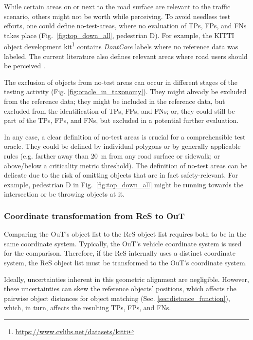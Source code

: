 \documentclass[conference]{IEEEtran}
\begin{document}
While certain areas on or next to the road surface are relevant to the traffic scenario, others might not be worth while perceiving. 
To avoid needless test efforts, one could define no-test-areas, where no evaluation of TPs, FPs, and FNs takes place (Fig.~\ref{fig:top_down_all}, pedestrian D). 
For example, the KITTI object development kit\footnote{\url{https://www.cvlibs.net/datasets/kitti}} contains \textit{DontCare} labels where no reference data was labeled. 
The current literature also defines relevant areas where road users should be perceived \cite{Philipp2022systematization, Topan2022zones, Butz2020soca, Wolf2021people, Chu2023sotif}.

The exclusion of objects from no-test areas can occur in different stages of the testing activity (Fig. \ref{fig:oracle_in_taxonomy}). 
They might already be excluded from the reference data; they might be included in the reference data, but excluded from the identification of TPs, FPs, and FNs; or, they could still be part of the TPs, FPs, and FNs, but excluded in a potential further evaluation.

In any case, a clear definition of no-test areas is crucial for a comprehensible test oracle. 
They could be defined by individual polygons or by generally applicable rules (e.g. farther away than \SI{20}{\meter} from any road surface or sidewalk; or above/below a criticality metric threshold).
The definition of no-test areas can be delicate due to the risk of omitting objects that are in fact safety-relevant. 
For example, pedestrian D in Fig.~\ref{fig:top_down_all} might be running towards the intersection or be throwing objects at it.

\subsubsection{Coordinate transformation from ReS to OuT}
\label{sec:geometrical_alignment}

Comparing the OuT's object list to the ReS object list requires both to be in the same coordinate system. 
Typically, the OuT's vehicle coordinate system is used for the comparison. 
Therefore, if the ReS internally uses a distinct coordinate system, the ReS object list must be transformed to the OuT's coordinate system. 

Ideally, uncertainties inherent in this geometric alignment are negligible. 
However, these uncertainties can skew the reference objects' positions, which affects the pairwise object distances for object matching (Sec. \ref{sec:distance_function}), which, in turn, affects the resulting TPs, FPs, and FNs.  
 
\end{document}
